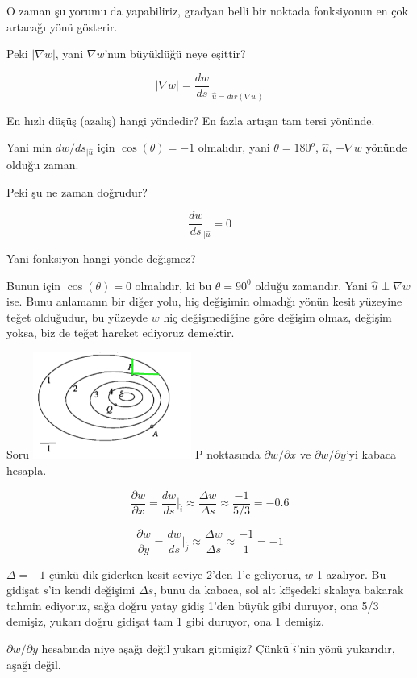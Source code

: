 \documentclass[12pt,fleqn]{article}\usepackage{../../common}
\begin{document}
O zaman şu yorumu da yapabiliriz, gradyan belli bir noktada fonksiyonun en
çok artacağı yönü gösterir. 

Peki $|\nabla w|$, yani $\nabla w$'nun büyüklüğü neye eşittir? 

$$ |\nabla w| =   \frac{dw}{ds}_{|\hat{u}=dir(\nabla w)}  $$

En hızlı düşüş (azalış) hangi yöndedir? En fazla artışın tam tersi
yönünde. 

Yani min $dw/ds_{|\hat{u}}$ için $\cos(\theta) = -1$ olmalıdır, yani $\theta =
180^o$,  $\hat{u}$, $-\nabla w$  yönünde olduğu zaman.

Peki şu ne zaman doğrudur? 

$$ \frac{dw}{ds}_{|\hat{u}} = 0 $$

Yani fonksiyon hangi yönde değişmez? 

Bunun için $\cos(\theta) = 0$ olmalıdır, ki bu $\theta = 90^0$ olduğu
zamandır. Yani $\hat{u} \perp \nabla w$ ise. Bunu anlamanın bir diğer yolu, hiç
değişimin olmadığı yönün kesit yüzeyine teğet olduğudur, bu yüzeyde $w$ hiç
değişmediğine göre değişim olmaz, değişim yoksa, biz de teğet hareket ediyoruz
demektir.

Soru
\includegraphics[height=3.5cm]{2d9.png}
P noktasında $\partial w/ \partial x$ ve $\partial w/\partial y$'yi 
kabaca hesapla. 

$$ \frac{\partial w}{\partial x} = \frac{dw}{ds} \bigg|_{\hat{i}} \approx
\frac{\Delta w}{\Delta s} \approx
\frac{-1}{5/3} = -0.6
$$

$$ \frac{\partial w}{\partial y} = \frac{dw}{ds} \bigg|_{\hat{j}} \approx
\frac{\Delta w}{\Delta s} \approx
\frac{-1}{1} = -1
$$

$\Delta = -1$ çünkü dik giderken kesit seviye 2'den 1'e geliyoruz, $w$ 1
azalıyor. Bu gidişat $s$'in kendi değişimi $\Delta s$, bunu da kabaca, sol alt
köşedeki skalaya bakarak tahmin ediyoruz, sağa doğru yatay gidiş 1'den büyük
gibi duruyor, ona 5/3 demişiz, yukarı doğru gidişat tam 1 gibi duruyor, ona 1
demişiz.

$\partial w / \partial y$ hesabında niye aşağı değil yukarı gitmişiz? Çünkü
$\hat{i}$'nin yönü yukarıdır, aşağı değil. 
\end{document}
